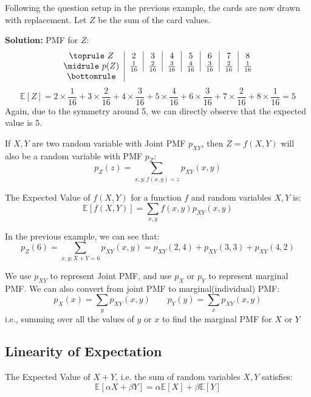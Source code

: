 \begin{eg}
    Following the question setup in the previous example, the cards are now drawn with replacement. Let \(Z\) be the sum of the card values. 

    \textbf{Solution:} 
    PMF for \(Z\):
    \[
        \begin{tabular}{c|c|c|c|c|c|c|c}
            \toprule
                \(Z\)  & 2 & 3 & 4 & 5 & 6 & 7 & 8  \\
            \midrule
                \(p(Z)\) & \(\frac{1}{16}\) & \(\frac{2}{16}\) & \(\frac{3}{16}\) & \(\frac{4}{16}\) & \(\frac{3}{16}\) & \(\frac{2}{16}\) & \(\frac{1}{16}\) \\
            \bottomrule
        \end{tabular}
    \]
    \[
        \mathbb{E}[Z] = 2 \times \dfrac{1}{16} + 3 \times \dfrac{2}{16} + 4 \times \dfrac{3}{16} + 5 \times \dfrac{4}{16} + 6 \times \dfrac{3}{16} + 7 \times \dfrac{2}{16} + 8 \times \dfrac{1}{16} = 5
    \]
    Again, due to the symmetry around 5, we can directly observe that the expected value is 5.
\end{eg}

If \(X, Y\) are two random variable with Joint PMF \(p_{XY} \), then \(Z=f(X, Y)\) will also be a random variable with PMF \(p_Z\): 
\[
    p_Z(z) = \sum_{x, y: f(x, y) = z} p_{XY}(x, y) 
\]

The Expected Value of \(f(X, Y)\) for a function \(f\) and random variables \(X, Y\) is:
\[
    \mathbb{E}[f(X, Y)] = \sum_{x, y} f(x, y)p_{XY}(x, y) 
\]

In the previous example, we can see that: 
\[
    p_Z(6) = \sum_{x, y: X + Y = 6} p_{XY}(x, y) = p_{XY}(2, 4) + p_{XY}(3, 3) + p_{XY}(4, 2)
\]

\begin{remark}
    We use \(p_{XY}\) to represent Joint PMF, and use \(p_X\) or \(p_Y\) to represent marginal PMF. We can also convert from joint PMF to marginal(individual) PMF: 
    \[
        p_X(x) = \sum_{y} p_{XY} (x, y) \quad\quad p_Y(y) = \sum_{x} p_{XY} (x, y)
    \]
    i.e., summing over all the values of \(y\) or \(x\) to find the marginal PMF for \(X\) or \(Y\) 
\end{remark}

\subsection{Linearity of Expectation}
The Expected Value of \(X + Y\), i.e. the sum of random variables \(X, Y\) satisfies: 
\[
    \mathbb{E}[\alpha X + \beta Y] = \alpha \mathbb{E}[X] + \beta \mathbb{E}[Y]
\]

